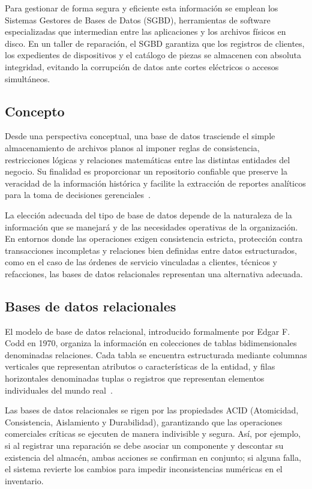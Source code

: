 Para gestionar de forma segura y eficiente esta información se emplean los Sistemas Gestores de Bases de Datos (SGBD), herramientas de software especializadas que intermedian entre las aplicaciones y los archivos físicos en disco. En un taller de reparación, el SGBD garantiza que los registros de clientes, los expedientes de dispositivos y el catálogo de piezas se almacenen con absoluta integridad, evitando la corrupción de datos ante cortes eléctricos o accesos simultáneos.

\subsection{Concepto}

Desde una perspectiva conceptual, una base de datos trasciende el simple almacenamiento de archivos planos al imponer reglas de consistencia, restricciones lógicas y relaciones matemáticas entre las distintas entidades del negocio. Su finalidad es proporcionar un repositorio confiable que preserve la veracidad de la información histórica y facilite la extracción de reportes analíticos para la toma de decisiones gerenciales~\cite{elmasri2016fundamentals}.

La elección adecuada del tipo de base de datos depende de la naturaleza de la información que se manejará y de las necesidades operativas de la organización. En entornos donde las operaciones exigen consistencia estricta, protección contra transacciones incompletas y relaciones bien definidas entre datos estructurados, como en el caso de las órdenes de servicio vinculadas a clientes, técnicos y refacciones, las bases de datos relacionales representan una alternativa adecuada.

\subsection{Bases de datos relacionales}

El modelo de base de datos relacional, introducido formalmente por Edgar F. Codd en 1970, organiza la información en colecciones de tablas bidimensionales denominadas relaciones. Cada tabla se encuentra estructurada mediante columnas verticales que representan atributos o características de la entidad, y filas horizontales denominadas tuplas o registros que representan elementos individuales del mundo real~\cite{elmasri2016fundamentals}.

Las bases de datos relacionales se rigen por las propiedades ACID (Atomicidad, Consistencia, Aislamiento y Durabilidad), garantizando que las operaciones comerciales críticas se ejecuten de manera indivisible y segura. Así, por ejemplo, si al registrar una reparación se debe asociar un componente y descontar su existencia del almacén, ambas acciones se confirman en conjunto; si alguna falla, el sistema revierte los cambios para impedir inconsistencias numéricas en el inventario.

